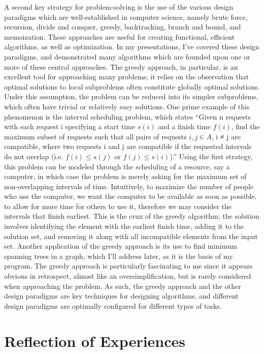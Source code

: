 \documentclass{article}
\begin{document}
A second key strategy for problem-solving is the use of the various design paradigms which are well-established in computer science, namely brute force, recursion, divide and conquer, greedy, backtracking, branch and bound, and memoization. These approaches are useful for creating functional, efficient algorithms, as well as optimization. In my presentations, I’ve covered these design paradigms, and demonstrated many algorithms which are founded upon one or more of these central approaches. The greedy approach, in particular, is an excellent tool for approaching many problems; it relies on the observation that optimal solutions to local subproblems often constitute globally optimal solutions. Under this assumption, the problem can be reduced into its simpler subproblems, which often have trivial or relatively easy solutions. One prime example of this phenomenon is the interval scheduling problem, which states “Given n requests with each request i specifying a start time $s(i)$  and a finish time $f(i)$, find the maximum subset of requests such that all pairs of requests $i,j \in A$, i  ≠ j are compatible, where two requests i and j are compatible if the requested intervals do not overlap (i.e. $f(i) \leq s(j)$  or $f(j) \leq s(i)$).” Using the first strategy, this problem can be modeled through the scheduling of a resource, say a computer, in which case the problem is merely asking for the maximum set of non-overlapping intervals of time. Intuitively, to maximize the number of people who use the computer, we want the computer to be available as soon as possible, to allow for more time for others to use it, therefore we may consider the intervals that finish earliest. This is the crux of the greedy algorithm; the solution involves identifying the element with the earliest finish time, adding it to the solution set, and removing it along with all incompatible elements from the input set. Another application of  the greedy approach is its use to find minimum spanning trees in a graph, which I’ll address later, as it is the basis of my program. The greedy approach is particularly fascinating to me since it appears obvious in retrospect, almost like an oversimplification, but is rarely considered when approaching the problem. As such, the greedy approach and the other design paradigms are key techniques for designing algorithms, and different design paradigms are optimally configured for different types of tasks.

\section{Reflection of Experiences}
\end{document}
